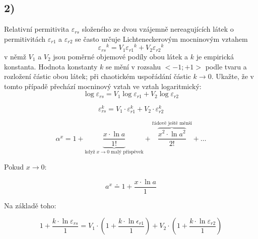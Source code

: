 \newpage


\subsection*{2)}
Relativní permitivita $\varepsilon_{rs}$ složeného ze dvou vzájemně nereagujících látek o permitivitách $\varepsilon_{r1}$ a $\varepsilon_{r2}$ se často určuje Lichteneckerovým mocninovým vztahem
\begin{equation}
    {{\varepsilon_{rs}}^k}={V_1{\varepsilon_{r1}}^k}+{V_2{\varepsilon_{r2}}^k}
\end{equation}
v němž $V_1$ a $V_2$ jsou poměrné objemové podíly obou látek a $k$ je empirická konstanta. Hodnota konstanty $k$ se mění v rozsahu $<-1; +1>$ podle tvaru a rozložení částic obou látek; při chaotickém uspořádání částic $k\rightarrow 0$. Ukažte, že v tomto případě přechází mocninový vztah ve vztah logaritmický:
\begin{equation}
    {\log{\varepsilon_{rs}}}={V_1\log{\varepsilon_{r1}}}+{V_2\log{\varepsilon_{r2}}}
\end{equation}


\begin{equation*}
    \varepsilon_{rs}^k = V_1 \cdot \varepsilon_{r1}^k + V_2 \cdot \varepsilon_{r2}^k
\end{equation*}

\begin{equation*}
    \alpha^x = 1 + \underbrace{\frac{x \cdot \ln a}{1!}}_{\textrm{když} \; x \rightarrow 0 \; \textrm{malý příspěvek}} + \overbrace{\frac{x^2 \cdot \ln a^2}{2!}}^{\textrm{řádově ještě měnší}} + \dots 
\end{equation*}

Pokud $x\rightarrow 0$:

\begin{equation*}
    a^x \doteq 1 + \frac{x \cdot \ln a}{1}
\end{equation*}

Na základě toho:

\begin{equation*}
    1 + \frac{k \cdot \ln \varepsilon_{rs}}{1} = V_1 \cdot \left( 1 + \frac{k \cdot \ln \epsilon_{r1}}{1} \right) + V_2 \cdot \left( 1 + \frac{k \cdot \ln \varepsilon_{r2}}{1} \right)
\end{equation*}

